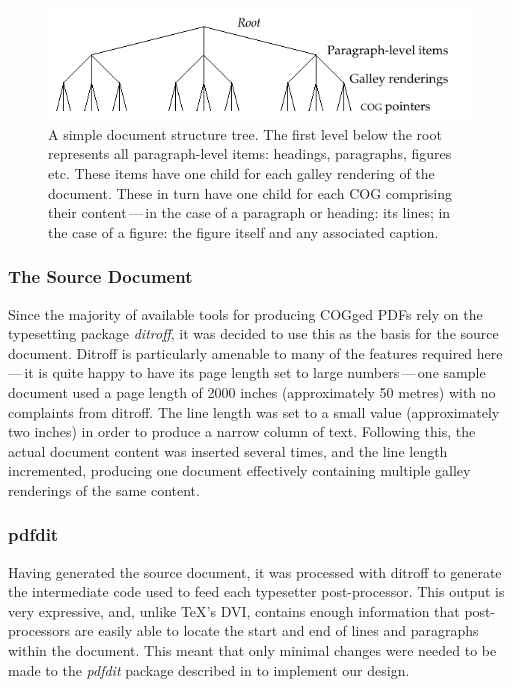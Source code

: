 \begin{figure}
    \centering
    \includegraphics[width=\textwidth]{gfx/tree}
    \caption[A simple document structure tree]{A simple document structure tree. The first level
below the root represents all
paragraph-level items: headings, paragraphs, figures etc. These items have one child for each galley
rendering of the document. These in turn have one child for each COG comprising their
content\,---\,in the case of a paragraph or heading: its lines; in the case of a figure: the figure
itself and any associated caption.}\vspace{-3pt}
    \label{tree}
\end{figure}

\subsubsection{The Source Document}
Since the majority of available tools for producing COGged PDFs rely on the typesetting package
\emph{ditroff}, it was decided to use this as the basis for the source document. Ditroff is
particularly amenable to many of the features required here\,---\,it is quite happy to have its page
length set to large numbers\,---\,one sample document used a page length of 2000 inches
(approximately 50 metres) with no complaints from ditroff. The line length was set to a small value
(approximately two inches) in order to produce a narrow column of text. Following this, the actual
document content was inserted several times, and the line length incremented, producing one document
effectively containing multiple galley renderings of the same content.



\subsubsection{pdfdit}
Having generated the source document, it was processed with ditroff to generate the intermediate
code used to feed each typesetter post-pro\-cessor. This output is very expressive, and, unlike
\TeX's DVI, contains enough information that post-processors are easily able to locate the start and
end of lines and paragraphs within the document. This meant that only minimal changes were needed to
be made to the \emph{pdfdit} package described in \cite{Bagley2003} to implement our design.

